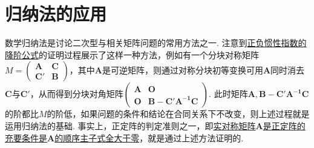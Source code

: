 \documentclass[../../main.tex]{subfiles}
\begin{document}
\section{归纳法的应用}

数学归纳法是讨论二次型与相关矩阵问题的常用方法之一. 注意到\hyperref[proposition:正负惯性指数的降阶公式]{正负惯性指数的降阶公式}的证明过程展示了这样一种方法，例如有一个分块对称矩阵$M = \begin{pmatrix}
\boldsymbol{A} & \boldsymbol{C} \\
\boldsymbol{C}' & \boldsymbol{B}
\end{pmatrix}$，其中$\boldsymbol{A}$是可逆矩阵，则通过对称分块初等变换可用$\boldsymbol{A}$同时消去$\boldsymbol{C}$与$\boldsymbol{C}'$，从而得到分块对角矩阵$\begin{pmatrix}
\boldsymbol{A} & \boldsymbol{O} \\
\boldsymbol{O} & \boldsymbol{B - C'A^{-1}C}
\end{pmatrix}$. 此时矩阵$\boldsymbol{A}, \boldsymbol{B - C'A^{-1}C}$的阶都比$M$的阶低，如果问题的条件和结论在合同关系下不改变，则上述过程就是运用归纳法的基础. 事实上，正定阵的判定准则之一，即\hyperref[theorem:实正定阵的充要条件]{实对称矩阵$\boldsymbol{A}$是正定阵的充要条件是$\boldsymbol{A}$的顺序主子式全大于零}，就是通过上述方法证明的. 
\end{document}
